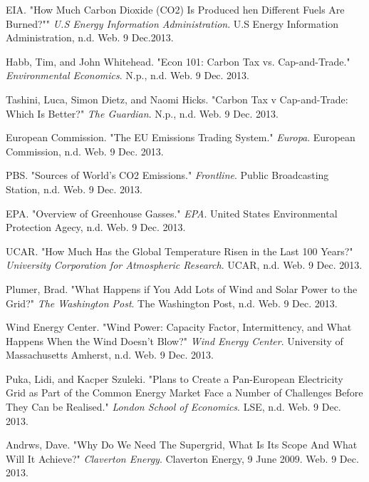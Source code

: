 \documentclass{article}
\begin{document}
\begin{thebibliography}{20}

 EIA. "How Much Carbon Dioxide (CO2) Is Produced hen Different Fuels Are Burned?"" \emph{U.S Energy Information Administration}. U.S Energy Information Administration, n.d. Web. 9 Dec.2013.

 Habb, Tim, and John Whitehead. "Econ 101: Carbon Tax vs. Cap-and-Trade." \emph{Environmental Economics}. N.p., n.d. Web. 9 Dec. 2013. 

 Tashini, Luca, Simon Dietz, and Naomi Hicks. "Carbon Tax v Cap-and-Trade: Which Is Better?" \emph{The Guardian}. N.p., n.d. Web. 9 Dec. 2013. 

 European Commission. "The EU Emissions Trading System." \emph{Europa}. European Commission, n.d. Web. 9 Dec. 2013. 

 PBS. "Sources of World's CO2 Emissions." \emph{Frontline}. Public Broadcasting Station, n.d. Web. 9 Dec. 2013. 

 EPA. "Overview of Greenhouse Gasses." \emph{EPA}. United States Environmental Protection Agecy, n.d. Web. 9 Dec. 2013. 

 UCAR. "How Much Has the Global Temperature Risen in the Last 100 Years?" \emph{University Corporation for Atmospheric Research}. UCAR, n.d. Web. 9 Dec. 2013. 

 Plumer, Brad. "What Happens if You Add Lots of Wind and Solar Power to the  Grid?" \emph{The Washington Post}. The Washington Post, n.d. Web. 9 Dec. 2013.

 Wind Energy Center. "Wind Power: Capacity Factor, Intermittency, and What Happens When the Wind Doesn't Blow?" \emph{Wind Energy Center}. University of Massachusetts Amherst, n.d. Web. 9 Dec. 2013.  

 Puka, Lidi, and Kacper Szuleki. "Plans to Create a Pan-European Electricity Grid as Part of the Common Energy Market Face a Number of Challenges Before They Can be Realised." \emph{London School of Economics}. LSE, n.d. Web. 9 Dec. 2013. 

 Andrws, Dave. "Why Do We Need The Supergrid, What Is Its Scope And What Will It Achieve?" \emph{Claverton Energy}. Claverton Energy, 9 June 2009. Web. 9 Dec. 2013. 




\end{thebibliography}
\end{document}
